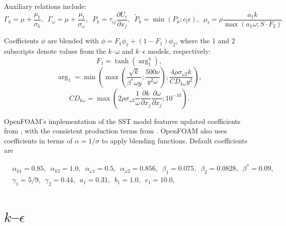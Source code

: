 Auxiliary relations include:
\begin{equation}
    \Gamma_k = \mu + \frac{\mu_t}{\sigma_k}, \, \, \,
    \Gamma_\omega = \mu + \frac{\mu_t}{\sigma_\omega}, \, \, \,
    P_k = \tau_{ij} \frac{\partial U_i}{\partial x_j}, \, \, \,
    \tilde{P}_k = \min(P_k;c_l \epsilon), \, \, \,
    \mu_t = \rho \frac{a_1 k}{\max(a_1 \omega; S \cdot F_2)}
\end{equation}

Coefficients $\phi$ are blended with $\phi = F_1 \phi_1 + (1 - F_1) \phi_2$,
where the 1 and 2 subscripts denote values from the $k$--$\omega$ and
$k$--$\epsilon$ models, respectively:
\begin{equation}
    F_1 = \tanh (\arg_1^4),
\end{equation}
\begin{equation}
    \arg_1 = \min
    \left(
    \max
    \left(
    \frac{\sqrt{k}}{\beta^* \omega y};
    \frac{500 \nu}{y^2 \omega}
    \right);
    \frac{4 \rho \sigma_{\omega2} k}{CD_{k \omega} y^2}
    \right),
\end{equation}
\begin{equation}
    CD_{k \omega} = \max
    \left(
    2 \rho \sigma_{\omega 2} \frac{1}{\omega}
    \frac{\partial k}{\partial x_j}
    \frac{\partial \omega}{\partial x_j};
    10^{-10}
    \right).
\end{equation}

OpenFOAM's implementation of the SST model features updated coefficients from
\cite{Menter2003}, with the consistent production terms from \cite{Menter2001}.
OpenFOAM also uses coefficients in terms of $\alpha = 1/\sigma$ to apply
blending functions. Default coefficients are

\begin{equation}
\begin{split}
&   \alpha_{k1} = 0.85, \, \, \,
    \alpha_{k2} = 1.0, \, \, \,
    \alpha_{\omega1} = 0.5, \, \, \,
    \alpha_{\omega2} = 0.856, \, \, \,
    \beta_1 = 0.075, \, \, \,
    \beta_2 = 0.0828, \, \, \,
    \beta^* = 0.09, \, \, \, \\
&   \gamma_1 = 5/9, \, \, \,
    \gamma_2 = 0.44, \, \, \,
    a_1 = 0.31, \, \, \,
    b_1 = 1.0, \, \, \,
    c_1 = 10.0, \, \, \,
\end{split}
\end{equation}


\section{$k$--$\epsilon$}

